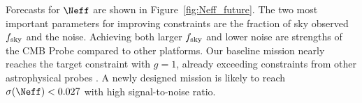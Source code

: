 Forecasts for $\Neff$ are shown in Figure~\ref{fig:Neff_future}.  The two most important parameters for improving constraints
are the fraction of sky observed $f_{\rm sky}$ and the noise. Achieving both larger $f_{\rm sky}$ and
lower noise are strengths of the CMB Probe compared to other platforms. 
Our baseline mission nearly reaches 
the target constraint with $g=1$, already exceeding constraints from other astrophysical probes . 
A newly designed mission is likely to reach $\sigma(\Neff) < 0.027$
with high signal-to-noise ratio. 



